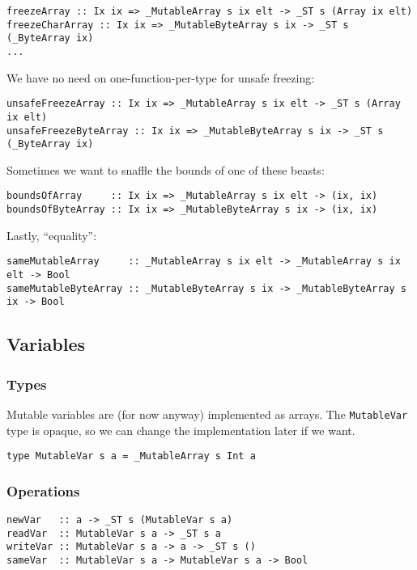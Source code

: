 \begin{verbatim}
freezeArray :: Ix ix => _MutableArray s ix elt -> _ST s (Array ix elt)
freezeCharArray :: Ix ix => _MutableByteArray s ix -> _ST s (_ByteArray ix)
...
\end{verbatim}

We have no need on one-function-per-type for unsafe freezing:
\begin{verbatim}
unsafeFreezeArray :: Ix ix => _MutableArray s ix elt -> _ST s (Array ix elt)  
unsafeFreezeByteArray :: Ix ix => _MutableByteArray s ix -> _ST s (_ByteArray ix)
\end{verbatim}

Sometimes we want to snaffle the bounds of one of these beasts:
\begin{verbatim}
boundsOfArray     :: Ix ix => _MutableArray s ix elt -> (ix, ix)  
boundsOfByteArray :: Ix ix => _MutableByteArray s ix -> (ix, ix)
\end{verbatim}

Lastly, ``equality'':
\begin{verbatim}
sameMutableArray     :: _MutableArray s ix elt -> _MutableArray s ix elt -> Bool
sameMutableByteArray :: _MutableByteArray s ix -> _MutableByteArray s ix -> Bool
\end{verbatim}


\subsection{Variables}

\subsubsection{Types}

Mutable variables are (for now anyway) implemented as arrays.  The \mbox{\tt MutableVar} type
is opaque, so we can change the implementation later if we want.
\begin{verbatim}
type MutableVar s a = _MutableArray s Int a
\end{verbatim}

\subsubsection{Operations}
\begin{verbatim}
newVar   :: a -> _ST s (MutableVar s a)
readVar  :: MutableVar s a -> _ST s a
writeVar :: MutableVar s a -> a -> _ST s ()
sameVar  :: MutableVar s a -> MutableVar s a -> Bool
\end{verbatim}

